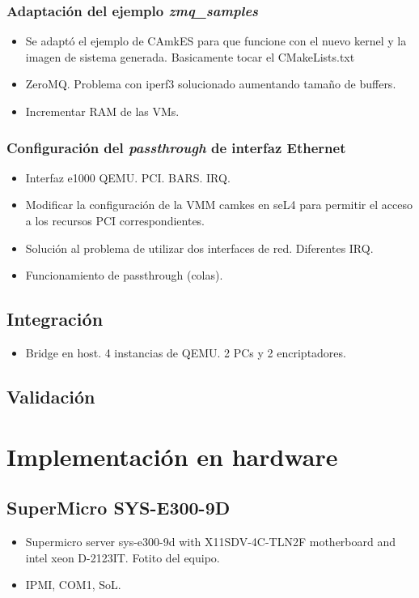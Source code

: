 \subsection{Adaptación del ejemplo \textit{zmq\_samples}}
\begin{itemize}
    \item Se adaptó el ejemplo de CAmkES para que funcione con el nuevo kernel y la imagen de sistema generada. Basicamente tocar el CMakeLists.txt
    \item ZeroMQ. Problema con iperf3 solucionado aumentando tamaño de buffers.
    \item Incrementar RAM de las VMs.
\end{itemize}

\subsection{Configuración del \textit{passthrough} de interfaz Ethernet}
\begin{itemize}
    \item Interfaz e1000 QEMU. PCI. BARS. IRQ.
    \item Modificar la configuración de la VMM camkes en seL4 para permitir el acceso a los recursos PCI correspondientes.
    \item Solución al problema de utilizar dos interfaces de red. Diferentes IRQ.
    \item Funcionamiento de passthrough (colas).
\end{itemize}

\section{Integración}
\begin{itemize}
    \item Bridge en host. 4 instancias de QEMU. 2 PCs y 2 encriptadores.
\end{itemize}

\section{Validación} %

\chapter{Implementación en hardware}
    \section{SuperMicro SYS-E300-9D}
    \begin{itemize}
        \item Supermicro server sys-e300-9d with X11SDV-4C-TLN2F motherboard and intel xeon D-2123IT. Fotito del equipo.
        \item IPMI, COM1, SoL.
    \end{itemize}
